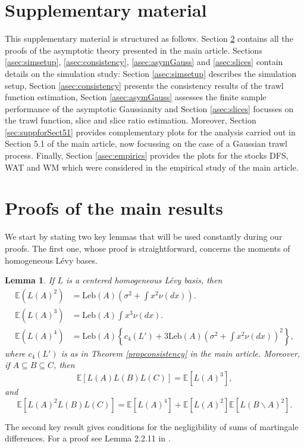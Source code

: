 \documentclass{article}
\theoremstyle{plain}
\newtheorem{lemma}{Lemma}
\theoremstyle{definition}
\theoremstyle{remark}
\newcommand{\Leb}{\ensuremath{\mathrm{Leb}}}
\newcommand{\Levy}{L\'{e}vy }
\begin{document}
\newpage
\begin{appendix}
 \section{Supplementary material} 
This supplementary material 
is structured as follows.
Section  \ref{sec:proofs} contains all the proofs of 
the  asymptotic theory presented in the main article.  
Sections \ref{asec:simsetup}, \ref{asec:consistency},
\ref{asec:asymGauss} and 
\ref{asec:slices} contain details on the simulation study:
Section \ref{asec:simsetup} describes the simulation setup, Section \ref{asec:consistency} presents the consistency results of the trawl function estimation, Section \ref{asec:asymGauss}
assesses the finite sample performance of the asymptotic Gaussianity and Section  \ref{asec:slices}  focusses on the trawl function, slice and slice ratio estimation. 
Moreover, Section \ref{sec:suppforSect51}
provides complementary plots for the analysis carried out in Section 5.1 of the main article, now focussing on the case of a Gaussian trawl process. 
Finally, Section \ref{asec:empirics} provides the plots for the stocks DFS, WAT and WM which were considered in the empirical study of the main article. 

\section{Proofs of the main results}
\label{sec:proofs}
We start by stating two key lemmas that will be used constantly during our proofs. The first one, whose proof is straightforward, concerns the moments of homogeneous \Levy bases. 

\begin{lemma}\label{lemmamoments}If $L$ is a centered homogeneous
	\Levy basis, then 
	\begin{align*}
		\mathbb{E}(L(A)^{2}) & =\Leb(A)(\sigma^{2}+\int x^{2}\nu(dx)).\\
		\mathbb{E}(L(A)^{3}) & =\Leb(A)\int x^{3}\nu(dx).\\
		\mathbb{E}(L(A)^{4}) & =\Leb(A)\left\{ c_{4}(L')+3\Leb(A)(\sigma^{2}+\int x^{2}\nu(dx))^{2}\right\} ,
	\end{align*}
    where $c_{4}(L')$ is as in Theorem  \ref{propconsistency}  in the main article. Moreover, if $A\subseteq B\subseteq C$, then 
	\[
	\mathbb{E}\left[L(A)L(B)L(C)\right]=\mathbb{E}\left[L(A)^{3}\right],
	\]
	and 
	\[
	\mathbb{E}\left[L(A)^{2}L(B)L(C)\right]=\mathbb{E}\left[L(A)^{4}\right]+\mathbb{E}\left[L(A)^{2}\right]\mathbb{E}\left[L(B\backslash A)^{2}\right].
	\]
\end{lemma}
The second key result gives conditions for the negligibility of sums of martingale differences. For a proof see Lemma 2.2.11 in \cite{JacProt11}.


\end{appendix}
\end{document}

